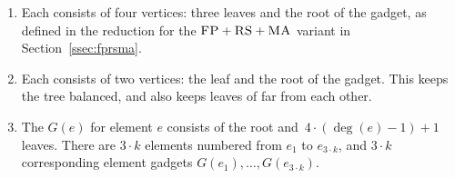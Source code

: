 \begin{enumerate}
  \item Each {\TripleGadget} consists of four vertices: three leaves and the root of the gadget, as defined in the reduction for the $\textsc{FP}+\textsc{RS}+\textsc{MA}$ variant in Section~\ref{ssec:fprsma}.
  \item Each {\UnqGadget} consists of two vertices: the leaf and the root of the gadget.
  This keeps the tree balanced, and also keeps leaves of
  {\UnqGadgets} far from each other.
  \item The {\ElGadget} $G(e)$ for element $e$ consists of the
  root and~$4\cdot(\deg(e)-1)+1$ leaves. There are $3\cdot k$ elements numbered from $e_1$ to $e_{3\cdot k}$, and $3\cdot k $ corresponding element gadgets $G(e_1), \ldots, G(e_{3\cdot k})$.
\end{enumerate}

